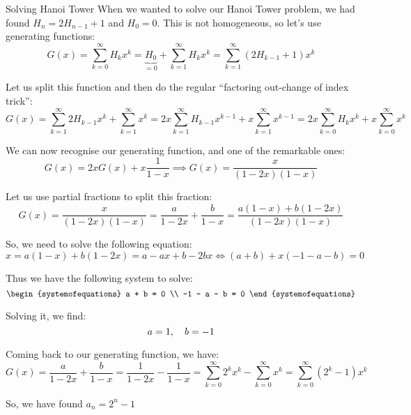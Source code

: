 \documentclass[a4paper]{article}
\begin{document}
\begin{parag}{Solving Hanoi Tower}
    When we wanted to solve our Hanoi Tower problem, we had found $H_n = 2H_{n-1} + 1$ and $H_0 = 0$. This is not homogeneous, so let's use generating functions: 
    \[G\left(x\right) = \sum_{k=0}^{\infty} H_k x^k = \underbrace{H_0}_{=0} + \sum_{k=1}^{\infty} H_{k} x^k = \sum_{k=1}^{\infty} \left(2 H_{k - 1} + 1\right)x^k \]

    Let us split this function and then do the regular ``factoring out-change of index trick'': 
    \[G\left(x\right) = \sum_{k=1}^{\infty} 2H_{k-1} x^k + \sum_{k=1}^{\infty} x^k = 2x \sum_{k=1}^{\infty} H_{k-1} x^{k-1} + x \sum_{k=1}^{\infty} x^{k-1} = 2x \sum_{k=0}^{\infty} H_k x^k + x\sum_{k = 0}^{\infty} x^k\]

    We can now recognise our generating function, and one of the remarkable ones: 
    \[G\left(x\right) = 2x G\left(x\right) + x \frac{1}{1-x} \implies G\left(x\right) = \frac{x}{\left(1 - 2x\right)\left(1 - x\right)}\]

    Let us use partial fractions to split this fraction: 
    \[G\left(x\right) = \frac{x}{\left(1 - 2x\right)\left(1 - x\right)} = \frac{a}{1 - 2x} + \frac{b}{1 - x} = \frac{a\left(1 - x\right) + b\left(1 - 2x\right)}{\left(1 - 2x\right)\left(1 - x\right)}\]
    
    So, we need to solve the following equation: 
    \[x = a\left(1 -x\right) + b\left(1 - 2x\right) = a - ax + b - 2bx \iff \left(a + b\right) + x\left(-1 - a - b\right) = 0\]
    
    Thus we have the following system to solve: 
    \[\begin{systemofequations}
    a + b = 0 \\
    -1 - a - b = 0
    \end{systemofequations}\]

    Solving it, we find: 
    \[a = 1, \quad b = -1\]
    
    Coming back to our generating function, we have: 
    \[G\left(x\right) = \frac{a}{1 - 2x} + \frac{b}{1 - x} = \frac{1}{1-2x} - \frac{1}{1-x} = \sum_{k=0}^{\infty} 2^k x^k - \sum_{k=0}^{\infty} x^k = \sum_{k=0}^{\infty} \left(2^k -  1\right)x^k\]
    
    So, we have found $a_n = 2^n - 1$
\end{parag}
\end{document}
